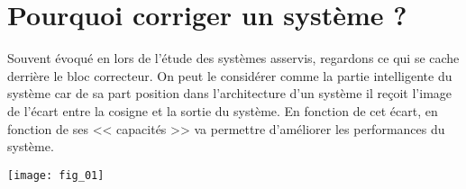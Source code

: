 \def\xxactivite{Cours}
\def\xxauteur{\textsl{Xavier Pessoles}}

\fichefalse
\proftrue
\tdfalse
\courstrue

\def\xxnumchapitre{Chapitre 1 \vspace{.2cm}}
\def\xxchapitre{\hspace{.12cm} Correction des SLCI}

\def\xxcompetences{%
\textsl{%
\textbf{Savoirs et compétences :}\\
\begin{itemize}[label=\ding{112},font=\color{ocre}] 
\item \textit{Res1.C4 : } correction;
\item \textit{Res1.C4.SF1 : } proposer la démarche de réglage d’un correcteur proportionnel, proportionnel intégral et à avance de phase,
\item \textit{Con.C2 : } 	correction d’un système asservi	;
\item \textit{Con.C2.SF1 : } choisir un type de correcteur adapté.
\end{itemize}
}}


\def\xxfigures{
}%


\iflivret

\else

\fi
\setlength{\columnseprule}{.1pt}

\vspace{2cm}
\pagestyle{fancy}
\thispagestyle{plain}


\section{Pourquoi corriger un système ?}

\noindent
\begin{minipage}[c]{.6\linewidth}
\hspace{.4cm} Souvent évoqué en lors de l'étude des systèmes asservis, regardons ce qui se cache derrière le bloc correcteur. On peut le considérer comme la partie intelligente du système car de sa part position dans l'architecture d'un système il reçoit l'image de l'écart entre la cosigne et la sortie du système. En fonction de cet écart, en fonction de ses << capacités >> va permettre d'améliorer les performances du système. 
\end{minipage} \hfill
\begin{minipage}[c]{.35\linewidth}
\begin{center}
\texttt{[image: fig\_01]}
\end{center}
\end{minipage} 


